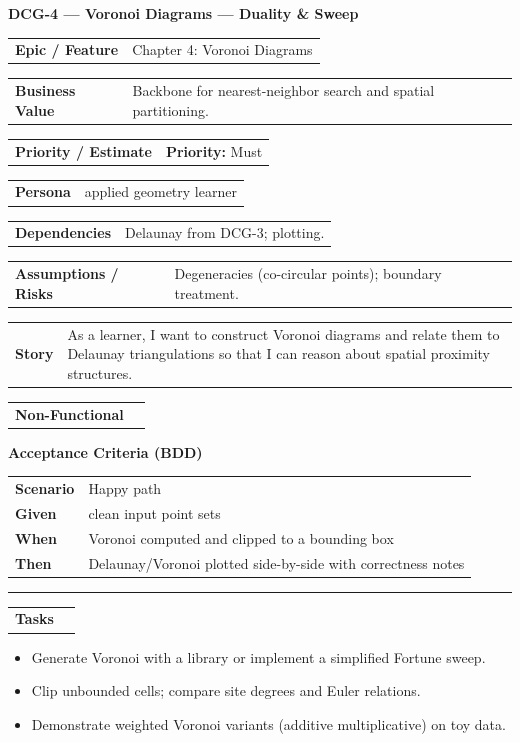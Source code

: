 \documentclass[11pt,a4paper]{article}
\makeatletter
\newcommand{\FieldRow}[2]{%
  \noindent\begin{tabularx}{\linewidth}{@{}>{\bfseries}l X@{}}#1 & #2\\\end{tabularx}%
}
\newcommand{\CardDivider}{\par\noindent\color{CardBorder}\rule{\linewidth}{0.4pt}\par\noindent\color{black}}
\newcommand{\StoryHeader}[2]{%
  {\large\bfseries \textcolor{CardTitle}{#1} --- #2}
}
\newcommand{\BDD}[4]{%
  \par\noindent\textbf{Acceptance Criteria (BDD)}\par\nobreak
  \noindent\begin{tabularx}{\linewidth}{@{}>{\bfseries}l X@{}}
  Scenario & #1\\
  Given & #2\\
  When & #3\\
  Then & #4\\
  \end{tabularx}\par
}
\newenvironment{TaskList}{%
  \begin{itemize}[leftmargin=1.25em,label=\(\square\)]
}{\end{itemize}}
\makeatother
\begin{document}
\begin{StoryCardBox}
\StoryHeader{DCG-4}{Voronoi Diagrams — Duality \& Sweep}\\[0.4em]
\FieldRow{Epic / Feature}{Chapter 4: Voronoi Diagrams}
\FieldRow{Business Value}{Backbone for nearest-neighbor search and spatial partitioning.}
\FieldRow{Priority / Estimate}{\textbf{Priority:} Must \quad \nfchip{SP: 5}}
\FieldRow{Persona}{applied geometry learner}
\FieldRow{Dependencies}{Delaunay from DCG-3; plotting.}
\FieldRow{Assumptions / Risks}{Degeneracies (co-circular points); boundary treatment.}
\FieldRow{Story}{As a learner, I want to construct Voronoi diagrams and relate them to Delaunay triangulations so that I can reason about spatial proximity structures.}

\FieldRow{Non-Functional}{\nfchip{Performance} \nfchip{Clarity} \nfchip{Reproducibility}}

\BDD{Happy path}{clean input point sets}{Voronoi computed and clipped to a bounding box}{Delaunay/Voronoi plotted side-by-side with correctness notes}

\CardDivider
\FieldRow{\large Tasks}{}
\begin{TaskList}
  \item Generate Voronoi with a library or implement a simplified Fortune sweep.
  \item Clip unbounded cells; compare site degrees and Euler relations.
  \item Demonstrate weighted Voronoi variants (additive multiplicative) on toy data.
\end{TaskList}
\end{StoryCardBox}
\end{document}
